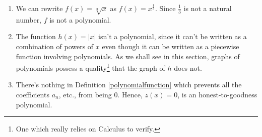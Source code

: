\begin{ex}
\begin{enumerate}
\item  We can rewrite $f(x) =\sqrt[3]{x}$ as $f(x) = x^{\frac{1}{3}}$.  Since $\frac{1}{3}$ is not a natural number, $f$ is not a polynomial.

\item  The function $h(x) = |x|$ isn't a polynomial, since it can't be written as a combination of powers of $x$ even though it can be written as a piecewise function involving polynomials.  As we shall see in this section, graphs of polynomials possess a quality\footnote{One which really relies on Calculus to verify.} that the graph of $h$ does not.  

\item  There's nothing in Definition \ref{polynomialfunction} which prevents all the coefficients $a_{n}$, etc., from being $0$.  Hence, $z(x) = 0$, is an honest-to-goodness polynomial.

\end{enumerate}

\end{ex}


\smallskip

